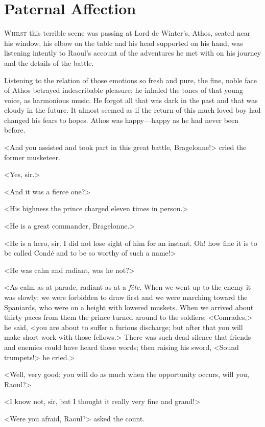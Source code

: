 \chapter{Paternal Affection}

 \lettrine{W}{hilst} this terrible scene was passing at Lord de Winter's, Athos, seated near his window, his elbow on the table and his head supported on his hand, was listening intently to Raoul's account of the adventures he met with on his journey and the details of the battle.

Listening to the relation of those emotions so fresh and pure, the fine, noble face of Athos betrayed indescribable pleasure; he inhaled the tones of that young voice, as harmonious music. He forgot all that was dark in the past and that was cloudy in the future. It almost seemed as if the return of this much loved boy had changed his fears to hopes. Athos was happy—happy as he had never been before.

<And you assisted and took part in this great battle, Bragelonne!> cried the former musketeer.

<Yes, sir.>

<And it was a fierce one?>

<His highness the prince charged eleven times in person.>

<He is a great commander, Bragelonne.>

<He is a hero, sir. I did not lose sight of him for an instant. Oh! how fine it is to be called Condé and to be so worthy of such a name!>

<He was calm and radiant, was he not?>

<As calm as at parade, radiant as at a \textit{fête}. When we went up to the enemy it was slowly; we were forbidden to draw first and we were marching toward the Spaniards, who were on a height with lowered muskets. When we arrived about thirty paces from them the prince turned around to the soldiers: <Comrades,> he said, <you are about to suffer a furious discharge; but after that you will make short work with those fellows.> There was such dead silence that friends and enemies could have heard these words; then raising his sword, <Sound trumpets!> he cried.>

<Well, very good; you will do as much when the opportunity occurs, will you, Raoul?>

<I know not, sir, but I thought it really very fine and grand!>

<Were you afraid, Raoul?> asked the count.


